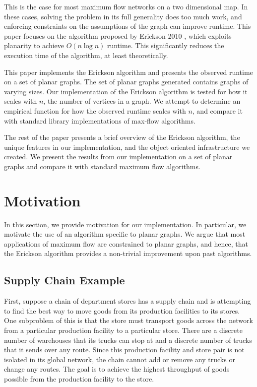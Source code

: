 \documentclass[12pt]{article}
\begin{document}
This is the case for most maximum flow networks on a two dimensional map. In these cases, solving the problem in its full generality does too much work, and enforcing constraints on the assumptions of the graph can improve runtime. This paper focuses on the algorithm proposed by Erickson 2010 \cite{erickson2010}, which exploits planarity to achieve $O(n \log n)$ runtime. This significantly reduces the execution time of the algorithm, at least theoretically.

This paper implements the Erickson algorithm and presents the observed runtime on a set of planar graphs. The set of planar graphs generated contains graphs of varying sizes. Our implementation of the Erickson algorithm is tested for how it scales with $n$, the number of vertices in a graph. We attempt to determine an empirical function for how the observed runtime scales with $n$, and compare it with standard library implementations of max-flow algorithms.

The rest of the paper presents a brief overview of the Erickson algorithm, the unique features in our implementation, and the object oriented infrastructure we created. We present the results from our implementation on a set of planar graphs and compare it with standard maximum flow algorithms.

\section{Motivation}

In this section, we provide motivation for our implementation. In particular, we motivate the use of an algorithm specific to planar graphs. We argue that most applications of maximum flow are constrained to planar graphs, and hence, that the Erickson algorithm provides a non-trivial improvement upon past algorithms. 

\subsection{Supply Chain Example}

First, suppose a chain of department stores has a supply chain and is attempting to find the best way to move goods from its production facilities to its stores. One subproblem of this is that the store must transport goods across the network from a particular production facility to a particular store. There are a discrete number of warehouses that its trucks can stop at and a discrete number of trucks that it sends over any route. Since this production facility and store pair is not isolated in its global network, the chain cannot add or remove any trucks or change any routes. The goal is to achieve the highest throughput of goods possible from the production facility to the store.
\end{document}
